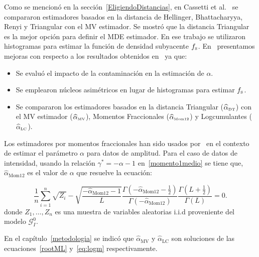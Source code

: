 Como se mencionó en la sección~\ref{EligiendoDistancias}, en Cassetti et al.~\cite{APSAR2013ParameterEstimationStochasticDistances} se compararon estimadores basados en la distancia de Hellinger, Bhattacharyya, Renyi y Triangular con el MV estimador. Se mostró que la distancia Triangular es la mejor opción para definir el MDE estimador. En ese trabajo se utilizaron histogramas para estimar la función de densidad subyacente $f_{\text{\tiny{S}}}$. En~\cite{gambini2015} %
presentamos mejoras con respecto a los resultados obtenidos en~\cite{APSAR2013ParameterEstimationStochasticDistances} ya que: 
\begin{itemize}
	\item Se evaluó el impacto de la contaminación en la estimación de $\alpha$.
	\item Se emplearon núcleos asimétricos en lugar de histogramas para estimar $f_{\text{\tiny{S}}}$.
	\item Se compararon los estimadores basados en la distancia Triangular ($\widehat{\alpha}_{\text{\tiny{DT}}}$) con el MV estimador ($\widehat{\alpha}_{\text{\tiny{MV}}}$), Momentos Fraccionales ($\widehat{\alpha}_{\text{\tiny{Mom12}}}$) y Logcumulantes ($\widehat{\alpha}_{\text{\tiny{LC}}}$). 
\end{itemize}

Los estimadores por momentos fraccionales han sido usados por~\cite{Frery97,GambiniSC08} en el contexto de estimar el parámetro $\alpha$ para datos de amplitud. Para el caso de datos de intensidad, usando la relación $\gamma^*=-\alpha-1$ en~\ref{momento1medio} se tiene que, $\widehat{\alpha}_\text{Mom12}$ es el valor de $\alpha$ que resuelve la ecuación:

\begin{equation}
\frac{1}{n} \sum_{i=1}^n \sqrt{Z_i} -\sqrt{\frac{-\widehat\alpha_{\text{Mom12}}-1}{L}}\frac{\Gamma ( -\widehat\alpha_{\text{Mom12}}-{\frac{1}{2}} )}{ \Gamma (-\widehat\alpha_{\text{Mom12}}) }
\frac{\Gamma (L+{\frac{1}{2}} )}{\Gamma (L)}=0.
\label{estim_moment1_2_gI0}
\end{equation}
donde $Z_1,\ldots,Z_n$ es una muestra de variables aleatorias i.i.d proveniente del modelo $\mathcal{G}_I^0$.

En el capítulo~\ref{metodologia} se indicó que $\widehat{\alpha}_\text{MV}$ y $\widehat{\alpha}_\text{LC}$ son soluciones de las ecuaciones~\ref{rootML} y~\ref{eq:logm} respectivamente.

